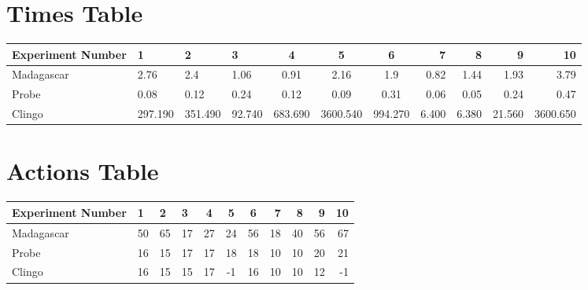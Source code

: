 \documentclass[8pt]{article}
\begin{document}
\begin{landscape}
\section{Times Table}\begin{tabular}{ | l | l | l | l | c | c | c | r | r | r | r | }\hline
Experiment Number & 1 & 2 & 3 & 4 & 5 & 6 & 7 & 8 & 9 & 10\\  \hline
Madagascar & 2.76 & 2.4 & 1.06 & 0.91 & 2.16 & 1.9 & 0.82 & 1.44 & 1.93 & 3.79\\  \hline
Probe & 0.08 & 0.12 & 0.24 & 0.12 & 0.09 & 0.31 & 0.06 & 0.05 & 0.24 & 0.47\\  \hline
Clingo & 297.190 & 351.490 & 92.740 & 683.690 & 3600.540 & 994.270 & 6.400 & 6.380 & 21.560 & 3600.650\\  \hline
\end{tabular}
\section{Actions Table}\begin{tabular}{ | l | l | l | l | c | c | c | r | r | r | r | }\hline
Experiment Number & 1 & 2 & 3 & 4 & 5 & 6 & 7 & 8 & 9 & 10\\ \hline
 Madagascar & 50 & 65 & 17 & 27 & 24 & 56 & 18 & 40 & 56 & 67\\ \hline
 Probe & 16 & 15 & 17 & 17 & 18 & 18 & 10 & 10 & 20 & 21\\ \hline
 Clingo & 16 & 15 & 15 & 17 & -1 & 16 & 10 & 10 & 12 & -1\\ \hline
\end{tabular}
\end{landscape}
\end{document}
